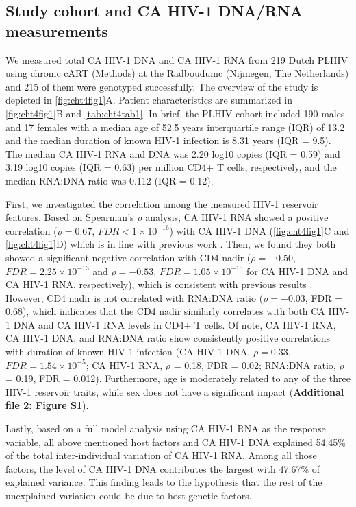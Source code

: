 \documentclass{book}
\begin{document}
\begin{refsection}
\subsection*{Study cohort and CA HIV-1 DNA/RNA measurements}
We measured total CA HIV-1 DNA and CA HIV-1 RNA from 219 Dutch PLHIV using chronic cART (Methods) at the Radboudumc (Nijmegen, The Netherlands) \cite{van2021Chronic} and 215 of them were genotyped successfully.
The overview of the study is depicted in \ref{fig:cht4fig1}A.
Patient characteristics are summarized in \ref{fig:cht4fig1}B and \ref{tab:cht4tab1}.
In brief, the PLHIV cohort included 190 males and 17 females with a median age of 52.5 years interquartile range (IQR) of 13.2 and the median duration of known HIV-1 infection is 8.31 years (IQR = 9.5).
The median CA HIV-1 RNA and DNA was 2.20 log10 copies (IQR = 0.59) and 3.19 log10 copies (IQR = 0.63) per million CD4+ T cells, respectively, and the median RNA:DNA ratio was 0.112 (IQR = 0.12).

First, we investigated the correlation among the measured HIV-1 reservoir features.
Based on Spearman's $\rho$ analysis, CA HIV-1 RNA showed a positive correlation ($\rho = 0.67$, $FDR < 1 \times 10^{-16}$) with CA HIV-1 DNA (\ref{fig:cht4fig1}C and \ref{fig:cht4fig1}D) which is in line with previous work \cite{Pasternak2018What}.
Then, we found they both showed a significant negative correlation with CD4 nadir ($\rho = -0.50$, $FDR = 2.25 \times 10^{-13}$ and $\rho = -0.53$, $FDR = 1.05 \times 10^{-15}$ for CA HIV-1 DNA and CA HIV-1 RNA, respectively), which is consistent with previous results \cite{Chun2002Relationship,Alidjinou2017The}.
However, CD4 nadir is not correlated with RNA:DNA ratio ($\rho = - 0.03$, FDR = 0.68), which indicates that the CD4 nadir similarly correlates with both CA HIV-1 DNA and CA HIV-1 RNA levels in CD4+ T cells.
Of note, CA HIV-1 RNA, CA HIV-1 DNA, and RNA:DNA ratio show consistently positive correlations with duration of known HIV-1 infection (CA HIV-1 DNA, $\rho = 0.33$, $FDR = 1.54 \times 10^{-5}$; CA HIV-1 RNA, $\rho$ = 0.18, FDR = 0.02; RNA:DNA ratio, $\rho$ = 0.19, FDR = 0.012).
Furthermore, age is moderately related to any of the three HIV-1 reservoir traits, while sex does not have a significant impact (\textbf{Additional file 2: Figure S1}).

Lastly, based on a full model analysis using CA HIV-1 RNA as the response variable, all above mentioned host factors and CA HIV-1 DNA explained 54.45\% of the total inter-individual variation of CA HIV-1 RNA.
Among all those factors, the level of CA HIV-1 DNA contributes the largest with 47.67\% of explained variance.
This finding leads to the hypothesis that the rest of the unexplained variation could be due to host genetic factors.


\end{refsection}
\end{document}
